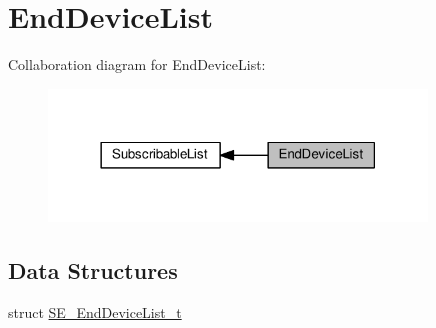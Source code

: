 \hypertarget{group__EndDeviceList}{}\section{End\+Device\+List}
\label{group__EndDeviceList}
Collaboration diagram for End\+Device\+List\+:\nopagebreak
\begin{figure}[H]
\begin{center}
\leavevmode
\includegraphics[width=285pt]{group__EndDeviceList}
\end{center}
\end{figure}
\subsection*{Data Structures}
\begin{DoxyCompactItemize}
\item 
struct \hyperlink{structSE__EndDeviceList__t}{S\+E\+\_\+\+End\+Device\+List\+\_\+t}
\end{DoxyCompactItemize}
